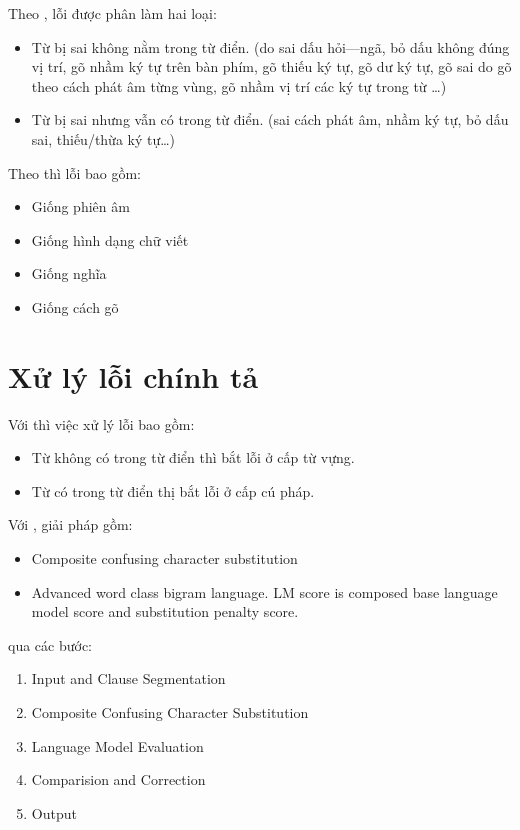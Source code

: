 \documentclass[a4paper,oneside]{book} %
\begin{document}
\noindent Theo \cite{Tuoi}, lỗi được phân làm hai loại:
\begin{itemize}
\item Từ bị sai không nằm trong từ điển. (do sai dấu hỏi---ngã, bỏ dấu
  không đúng vị trí, gõ nhầm ký tự trên bàn phím, gõ thiếu ký tự, gõ
  dư ký tự, gõ sai do gõ theo cách phát âm từng vùng, gõ nhầm vị trí
  các ký tự trong từ \ldots)
\item Từ bị sai nhưng vẫn có trong từ điển. (sai cách phát âm, nhầm ký
  tự, bỏ dấu sai, thiếu/thừa ký tự\ldots)
\end{itemize}

\noindent Theo \cite{Chang} thì lỗi bao gồm:
\begin{itemize}
\item Giống phiên âm
\item Giống hình dạng chữ viết
\item Giống nghĩa
\item Giống cách gõ
\end{itemize}

\section{Xử lý lỗi chính tả}

Với \cite{Tuoi} thì việc xử lý lỗi bao gồm:
\begin{itemize}
\item Từ không có trong từ điển thì bắt lỗi ở cấp từ vựng.
\item Từ có trong từ điển thị bắt lỗi ở cấp cú pháp.
\end{itemize}

Với \cite{Chang}, giải pháp gồm:
\begin{itemize}
\item Composite confusing character substitution
\item Advanced word class bigram language. LM score is composed base
  language model score and substitution penalty score.
\end{itemize}

qua các bước:
\begin{enumerate}
\item Input and Clause Segmentation
\item Composite Confusing Character Substitution
\item Language Model Evaluation
\item Comparision and Correction
\item Output
\end{enumerate}
\end{document}
